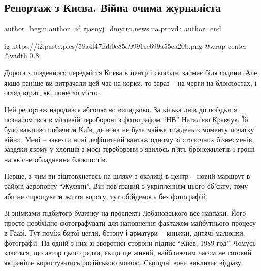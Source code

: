  
 
 
 
 
 
\subsection{Репортаж з Києва. Війна очима журналіста}
\label{sec:04_03_2022.stz.news.ua.pravda.1.reportazh_z_kieva}
 
\ifcmt
 author_begin
   author_id rjasnyj_dmytro,news.ua.pravda
 author_end
\fi

\ifcmt
  ig https://i2.paste.pics/58a4f47fab0e85d9991ce699a55ca20b.png
  @wrap center
  @width 0.8
\fi

\begin{zznagolos}
Дорога з південного передмістя Києва в центр і сьогодні займає біля години. Але
якщо раніше ви витрачали цей час на корки, то зараз – на черги на блокпостах, і
огляд втрат, які понесло місто.

Цей репортаж народився абсолютно випадково. За кілька днів до поїздки я
познайомився в місцевій теробороні з фотографом \enquote{НВ} Наталією Кравчук. Їй було
важливо побачити Київ, де вона не була майже тиждень з моменту початку війни.
Мені – завезти нині дефіцитний вантаж одному зі столичних бізнесменів, завдяки
якому у хлопців з моєї тероборони з’явилось п’ять бронежилетів і гроші на
якісне обладнання блокпостів. 

Перше, з чим ви зіштовхнетесь на шляху з околиці в центр – новий маршрут в
районі аеропорту \enquote{Жуляни}. Він пов'язаний з укріпленням цього об’єкту, тому аби
не спрощувати життя ворогу, тут обійдемось без фотографій. 	
\end{zznagolos}


Зі знімками підбитого будинку на проспекті Лобановського все навпаки. Його
просто необхідно фотографувати для наповнення фактажем майбутнього процесу в
Гаазі. Тут поміж битої цегли, бетону і арматури – книжки, дитячі малюнки,
фотографії. На одній з них зі зворотної сторони підпис \enquote{Киев. 1989 год}. Чомусь
здається, що автор цього рядка, якщо ще живий, найближчим часом не готовий як
раніше користуватись російською мовою. Сьогодні вона викликає відразу.

